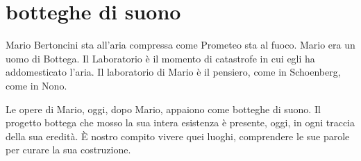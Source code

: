 %
%
%
%
%
%

\section*{botteghe di suono}


Mario Bertoncini sta all'aria compressa come Prometeo sta al fuoco. Mario era un
uomo di Bottega. Il Laboratorio è il momento di catastrofe in cui egli ha
addomesticato l'aria. Il laboratorio di Mario è il pensiero, come in Schoenberg,
come in Nono.

Le opere di Mario, oggi, dopo Mario, appaiono come botteghe di suono. Il
progetto bottega che mosso la sua intera esistenza è presente, oggi, in ogni
traccia della sua eredità. È nostro compito vivere quei luoghi, comprendere le
sue parole per curare la sua costruzione.

